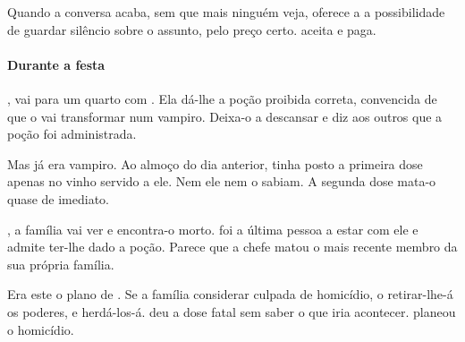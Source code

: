 Quando a conversa acaba, sem que mais ninguém veja,  oferece a  a possibilidade de guardar silêncio sobre o assunto, pelo preço certo.  aceita e paga.

\paragraph{Durante a festa}

,  vai para um quarto com . Ela dá-lhe a poção proibida correta, convencida de que o vai transformar num vampiro. Deixa-o a descansar e diz aos outros que a poção foi administrada.

Mas  já era vampiro. Ao almoço do dia anterior,  tinha posto a primeira dose apenas no vinho servido a ele. Nem ele nem  o sabiam. A segunda dose mata-o quase de imediato.

, a família vai ver  e encontra-o morto.  foi a última pessoa a estar com ele e admite ter-lhe dado a poção. Parece que a chefe matou o mais recente membro da sua própria família.

Era este o plano de . Se a família considerar  culpada de homicídio, o  retirar-lhe-á os poderes, e  herdá-los-á.  deu a dose fatal sem saber o que iria acontecer.  planeou o homicídio.
